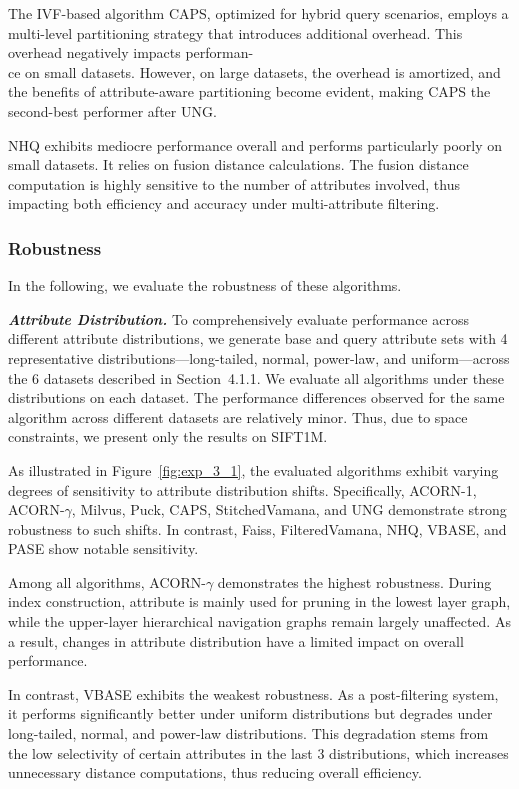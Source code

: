 \documentclass[sigconf, nonacm]{acmart}
\begin{document}
The IVF-based algorithm CAPS, optimized for hybrid query scenarios, employs a multi-level partitioning strategy that introduces additional overhead. This overhead negatively impacts performan-\\ce on small datasets. However, on large datasets, the overhead is amortized, and the benefits of attribute-aware partitioning become evident, making CAPS the second-best performer after UNG.

NHQ exhibits mediocre performance overall and performs particularly poorly on small datasets. It relies on fusion distance calculations. The fusion distance computation is highly sensitive to the number of attributes involved, thus impacting both efficiency and accuracy under multi-attribute filtering.




\subsubsection{Robustness}In the following, we evaluate the robustness of these algorithms.

\textit{\textbf{Attribute Distribution.}} To comprehensively evaluate performance across different attribute distributions, we generate base and query attribute sets with 4 representative distributions—long-tailed, normal, power-law, and uniform—across the 6 datasets described in Section~4.1.1. We evaluate all algorithms under these distributions on each dataset. The performance differences observed for the same algorithm across different datasets are relatively minor. Thus, due to space constraints, we present only the results on SIFT1M.

As illustrated in Figure~\ref{fig:exp_3_1}, the evaluated algorithms exhibit varying degrees of sensitivity to attribute distribution shifts. Specifically, ACORN-1, ACORN-$\gamma$, Milvus, Puck, CAPS, StitchedVamana, and UNG demonstrate strong robustness to such shifts. In contrast, Faiss, FilteredVamana, NHQ, VBASE, and PASE show notable sensitivity.

Among all algorithms, ACORN-\(\gamma\) demonstrates the highest robustness. During index construction, attribute is mainly used for pruning in the lowest layer graph, while the upper-layer hierarchical navigation graphs remain largely unaffected. As a result, changes in attribute distribution have a limited impact on overall performance.

In contrast, VBASE exhibits the weakest robustness. As a post-filtering system, it performs significantly better under uniform distributions but degrades under long-tailed, normal, and power-law distributions. This degradation stems from the low selectivity of certain attributes in the last 3 distributions, which increases unnecessary distance computations, thus reducing overall efficiency.
\end{document}
